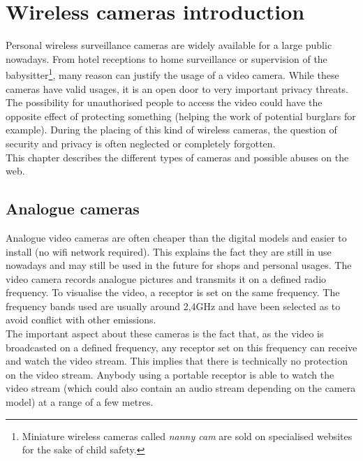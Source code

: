 
\chapter{Wireless cameras introduction}
\label{chap:wifi-cam}


Personal wireless surveillance cameras are widely available for a large public nowadays.
From hotel receptions to home surveillance or supervision of the babysitter\footnote{Miniature wireless cameras called \emph{nanny cam} are sold on specialised websites for the sake of child safety.}, many reason can justify the usage of a video camera.
While these cameras have valid usages, it is an open door to very important privacy threats.
The possibility for unauthorised people to access the video could have the opposite effect of protecting something (helping the work of potential burglars for example).
During the placing of this kind of wireless cameras, the question of security and privacy is often neglected or completely forgotten.\\

This chapter describes the different types of cameras and possible abuses on the web.

\section{Analogue cameras}
\label{sec:cam-analogic}

Analogue video cameras are often cheaper than the digital models and easier to install (no wifi network required).
This explains the fact they are still in use nowadays and may still be used in the future for shops and personal usages.
The video camera records analogue pictures and transmits it on a defined radio frequency.
To visualise the video, a receptor is set on the same frequency.
The frequency bands used are usually around 2,4GHz and have been selected as to avoid conflict with other emissions.\\

The important aspect about these cameras is the fact that, as the video is broadcasted on a defined frequency, any receptor set on this frequency can receive and watch the video stream.
This implies that there is technically no protection on the video stream.
Anybody using a portable receptor is able to watch the video stream (which could also contain an audio stream depending on the camera model) at a range of a few metres.\\


